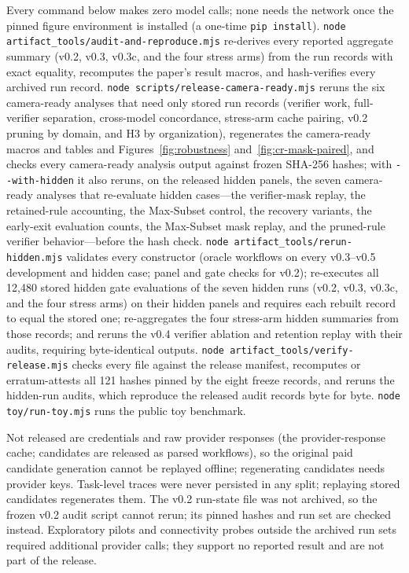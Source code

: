 \documentclass{article}
\begin{document}
Every command below makes zero model calls; none needs the network once the pinned figure environment is installed (a one-time \texttt{pip install}). \texttt{node artifact\_tools/audit-and-reproduce.mjs} re-derives every reported aggregate summary (v0.2, v0.3, v0.3c, and the four stress arms) from the run records with exact equality, recomputes the paper's result macros, and hash-verifies every archived run record. \texttt{node scripts/release-camera-ready.mjs} reruns the six camera-ready analyses that need only stored run records (verifier work, full-verifier separation, cross-model concordance, stress-arm cache pairing, v0.2 pruning by domain, and H3 by organization), regenerates the camera-ready macros and tables and Figures~\ref{fig:robustness} and~\ref{fig:cr-mask-paired}, and checks every camera-ready analysis output against frozen SHA-256 hashes; with \texttt{-{}-with-hidden} it also reruns, on the released hidden panels, the seven camera-ready analyses that re-evaluate hidden cases---the verifier-mask replay, the retained-rule accounting, the Max-Subset control, the recovery variants, the early-exit evaluation counts, the Max-Subset mask replay, and the pruned-rule verifier behavior---before the hash check. \texttt{node artifact\_tools/rerun-hidden.mjs} validates every constructor (oracle workflows on every v0.3--v0.5 development and hidden case; panel and gate checks for v0.2); re-executes all 12,480 stored hidden gate evaluations of the seven hidden runs (v0.2, v0.3, v0.3c, and the four stress arms) on their hidden panels and requires each rebuilt record to equal the stored one; re-aggregates the four stress-arm hidden summaries from those records; and reruns the v0.4 verifier ablation and retention replay with their audits, requiring byte-identical outputs. \texttt{node artifact\_tools/verify-release.mjs} checks every file against the release manifest, recomputes or erratum-attests all 121 hashes pinned by the eight freeze records, and reruns the hidden-run audits, which reproduce the released audit records byte for byte. \texttt{node toy/run-toy.mjs} runs the public toy benchmark.

Not released are credentials and raw provider responses (the provider-response cache; candidates are released as parsed workflows), so the original paid candidate generation cannot be replayed offline; regenerating candidates needs provider keys. Task-level traces were never persisted in any split; replaying stored candidates regenerates them. The v0.2 run-state file was not archived, so the frozen v0.2 audit script cannot rerun; its pinned hashes and run set are checked instead. Exploratory pilots and connectivity probes outside the archived run sets required additional provider calls; they support no reported result and are not part of the release.
\end{document}
